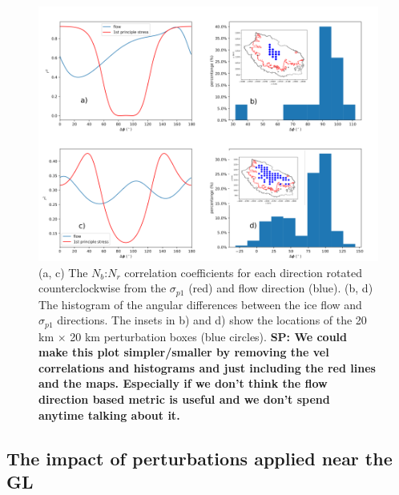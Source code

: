 \documentclass[tc, manuscript]{copernicus}
\begin{document}
\begin{figure}
	\centering
    \includegraphics[width=1\linewidth]{figs/larsenc_r2_all_direction.pdf}
    \caption{(a, c) The $N_b$:$N_r$ correlation coefficients for each direction rotated counterclockwise from the $\sigma_{p1}$ (red) and flow direction (blue). (b, d) The histogram of the angular differences between the ice flow and $\sigma_{p1}$ directions. The insets in b) and d) show the locations of the 20 km $\times$ 20 km perturbation boxes (blue circles). \textbf{SP: We could make this plot simpler/smaller by removing the vel correlations and histograms and just including the red lines and the maps. Especially if we don't think the flow direction based metric is useful and we don't spend anytime talking about it.}}
	\label{larsenc_r2_all_direction}
\end{figure}

\subsection{The impact of perturbations applied near the GL}
\end{document}
